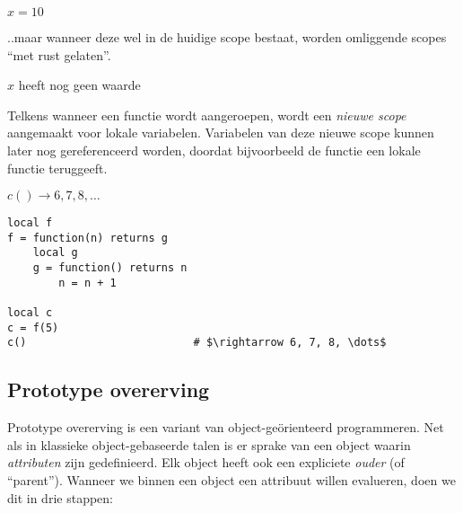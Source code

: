   \begin{CodeFragment}\label{exa:lexical}
		                      {}
		       {}
		               {}
		\Line{}                            {}
		                        {$x = 10$}
	\end{CodeFragment}

..maar wanneer deze wel in de huidige scope bestaat, worden omliggende scopes ``met rust gelaten''.

	\begin{CodeFragment}
		                      {}
		                      {}
		                 {}
		                  {}
		               {}
		\Line{}                            {}
		                        {$x$ heeft nog geen waarde}
	\end{CodeFragment}

Telkens wanneer een functie wordt aangeroepen, wordt een \emph{nieuwe scope} aangemaakt voor lokale variabelen. Variabelen van deze nieuwe scope kunnen later nog gereferenceerd worden, doordat bijvoorbeeld de functie een lokale functie teruggeeft.

	\begin{CodeFragment}
		                      {}
		      {}
		                  {}
		   {}
		           {}
		\Line{}                            {}
		                      {}
		                    {$c() \rightarrow 6, 7, 8, \dots$}
	\end{CodeFragment}

\begin{lstlisting}[caption=Een countervoorbeeld,label=exa:counter]
local f
f = function(n) returns g
    local g
    g = function() returns n
        n = n + 1

local c
c = f(5)
c()                          # $\rightarrow 6, 7, 8, \dots$
\end{lstlisting}


\subsection{Prototype overerving}

\begin{KelleyWouldRemove}
Prototype overerving is een  variant van object-geörienteerd programmeren. Net als in klassieke object-gebaseerde talen is er sprake van een object waarin \emph{attributen} zijn gedefinieerd. Elk object heeft ook een expliciete \emph{ouder} (of \enquote{parent}). Wanneer we binnen een object een attribuut willen evalueren, doen we dit in drie stappen:
\end{KelleyWouldRemove}

